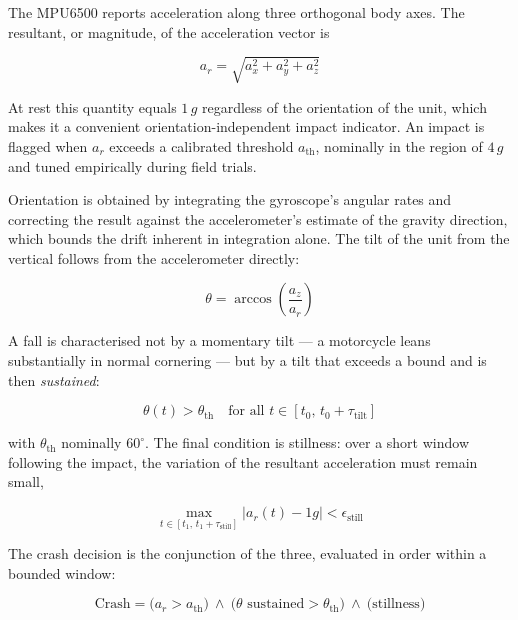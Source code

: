 \documentclass[12pt,a4paper,oneside]{report}
\begin{document}
The MPU6500 reports acceleration along three orthogonal body axes. The resultant, or
magnitude, of the acceleration vector is

\begin{equation}
a_{r} = \sqrt{a_x^{2} + a_y^{2} + a_z^{2}}
\end{equation}

At rest this quantity equals \(1\,g\) regardless of the orientation of the unit, which makes
it a convenient orientation-independent impact indicator. An impact is flagged when
\(a_r\) exceeds a calibrated threshold \(a_{\text{th}}\), nominally in the region of
\(4\,g\) and tuned empirically during field trials.

Orientation is obtained by integrating the gyroscope's angular rates and correcting the
result against the accelerometer's estimate of the gravity direction, which bounds the drift
inherent in integration alone. The tilt of the unit from the vertical follows from the
accelerometer directly:

\begin{equation}
\theta = \arccos\!\left(\frac{a_z}{a_{r}}\right)
\end{equation}

A fall is characterised not by a momentary tilt --- a motorcycle leans substantially in
normal cornering --- but by a tilt that exceeds a bound and is then \emph{sustained}:

\begin{equation}
\theta(t) > \theta_{\text{th}} \quad \text{for all } t \in [t_0,\, t_0 + \tau_{\text{tilt}}]
\end{equation}

with \(\theta_{\text{th}}\) nominally \(60^{\circ}\). The final condition is stillness:
over a short window following the impact, the variation of the resultant acceleration must
remain small,

\begin{equation}
\max_{t \in [t_1,\, t_1+\tau_{\text{still}}]} \bigl| a_{r}(t) - 1g \bigr|
  < \epsilon_{\text{still}}
\end{equation}

The crash decision is the conjunction of the three, evaluated in order within a bounded
window:

\begin{equation}
\mathrm{Crash} = \bigl(a_r > a_{\text{th}}\bigr)
  \ \wedge\ \bigl(\theta \text{ sustained} > \theta_{\text{th}}\bigr)
  \ \wedge\ \bigl(\text{stillness}\bigr)
\end{equation}
\end{document}
